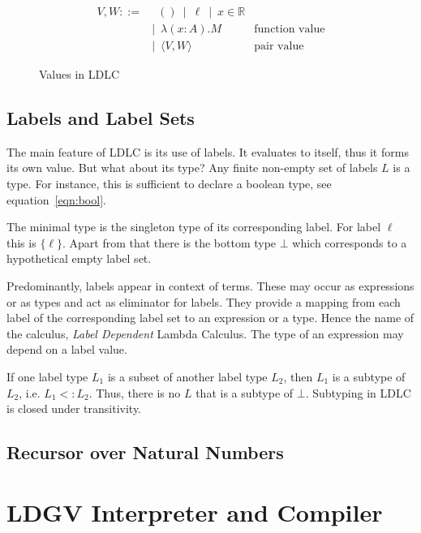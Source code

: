 \begin{figure}
\begin{align*}
    V, W ::=
    & \enspace () \enspace|\enspace
      \ell \enspace|\enspace
      x \in \mathbb{R} \\
    & |\enspace \lambda (x:A).M & \text{function value} \\
    & |\enspace \langle V, W \rangle & \text{pair value}
\end{align*}
\caption{Values in LDLC}
\label{fig:ldlc-values}
\end{figure}

\subsection{Labels and Label Sets}

The main feature of LDLC is its use of labels. It evaluates to itself, thus it forms its own value. But what about its type? Any finite non-empty set of labels $L$ is a type. For instance, this is sufficient to declare a boolean type, see equation~\ref{eqn:bool}.

The minimal type is the singleton type of its corresponding label. For label $\ell$ this is $\{\ell\}$. Apart from that there is the bottom type $\bot$ which corresponds to a hypothetical empty label set.

Predominantly, labels appear in context of \case terms. These may occur as expressions or as types and act as eliminator for labels. They provide a mapping from each label of the corresponding label set to an expression or a type. Hence the name of the calculus, \emph{Label Dependent} Lambda Calculus. The type of an expression may depend on a label value.

If one label type $L_1$ is a subset of another label type $L_2$, then $L_1$ is a subtype of $L_2$, i.e. $L_1 <: L_2$. Thus, there is no $L$ that is a subtype of $\bot$. Subtyping in LDLC is closed under transitivity.

\subsection{Recursor over Natural Numbers}


\section{LDGV Interpreter and Compiler}

